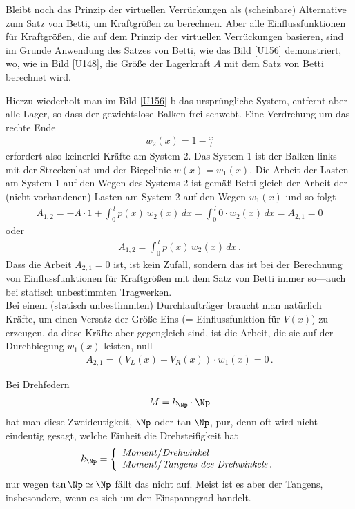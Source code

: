 {{{{Bleibt noch das Prinzip der virtuellen Verr\"{u}ckungen als (scheinbare) Alternative zum Satz von Betti, um Kraftgr\"{o}{\ss}en zu berechnen. Aber alle Einflussfunktionen f\"{u}r Kraftgr\"{o}{\ss}en, die auf dem Prinzip der virtuellen Verr\"{u}ckungen basieren, sind im Grunde Anwendung des Satzes von Betti, wie das Bild \ref{U156} demonstriert, wo, wie in Bild \ref{U148}, die Gr\"{o}{\ss}e der Lagerkraft $A$ mit dem Satz von Betti berechnet wird.

Hierzu wiederholt man im Bild \ref{U156} b das urspr\"{u}ngliche System, entfernt aber alle Lager, so dass der gewichtslose Balken frei schwebt. Eine Verdrehung um das rechte Ende
\begin{align}
w_2(x) = 1 - \frac{x}{l}
\end{align}
erfordert also keinerlei Kr\"{a}fte am System 2. Das System 1 ist der Balken links mit der Streckenlast und der Biegelinie $w(x) = w_1(x)$. Die Arbeit der Lasten am System 1 auf den Wegen des Systems 2 ist gem\"{a}{\ss} Betti gleich der Arbeit der (nicht vorhandenen) Lasten am System 2 auf den Wegen $w_1(x)$ und so folgt
\begin{align}
A_{1,2} = - A\cdot 1 + \int_0^{\,l} p(x)\,w_2(x)\,dx = \int_0^{\,l} 0\cdot w_2(x)\,dx = A_{2,1} = 0
\end{align}
oder
\begin{align}
A_{1,2} = \int_0^{\,l} p(x)\,w_2(x)\,dx\,.
\end{align}
Dass die Arbeit $A_{2,1} = 0$ ist, ist kein Zufall, sondern das ist bei der Berechnung von Einflussfunktionen f\"{u}r Kraftgr\"{o}{\ss}en mit dem Satz von Betti immer so---auch bei statisch unbestimmten Tragwerken.\\

Bei einem (statisch unbestimmten) Durchlauftr\"{a}ger braucht man nat\"{u}rlich Kr\"{a}fte, um einen Versatz der Gr\"{o}{\ss}e Eins (= Einflussfunktion f\"{u}r $V(x)$) zu erzeugen, da diese Kr\"{a}fte aber gegengleich sind, ist die Arbeit, die sie auf der Durchbiegung $w_1(x)$ leisten, null
\begin{align}
 A_{2,1} = (V_L(x) - V_R(x)) \cdot w_1(x) = 0\,.
\end{align}

\begin{remark}
Bei Drehfedern
\begin{align}
M = k_{\Np} \cdot \Np
\end{align}
hat man diese Zweideutigkeit, $\Np$ oder $\tan\,\Np$, pur, denn oft wird nicht eindeutig gesagt, welche Einheit die Drehsteifigkeit hat
\begin{align}
k_{\Np} = \left \{ \begin{array}{l } {\displaystyle  \text{{\em Moment\/}}/\text{{\em Drehwinkel\/}}  }      \\
{\displaystyle \text{{\em Moment\/}}/\text{{\em Tangens des Drehwinkels\/}}}\,.
\end{array} \right.
\end{align}
nur wegen $\tan \Np \simeq \Np$ f\"{a}llt das nicht auf. Meist ist es aber der Tangens, insbesondere, wenn es sich um den Einspanngrad handelt.
\end{remark}

}}}}
